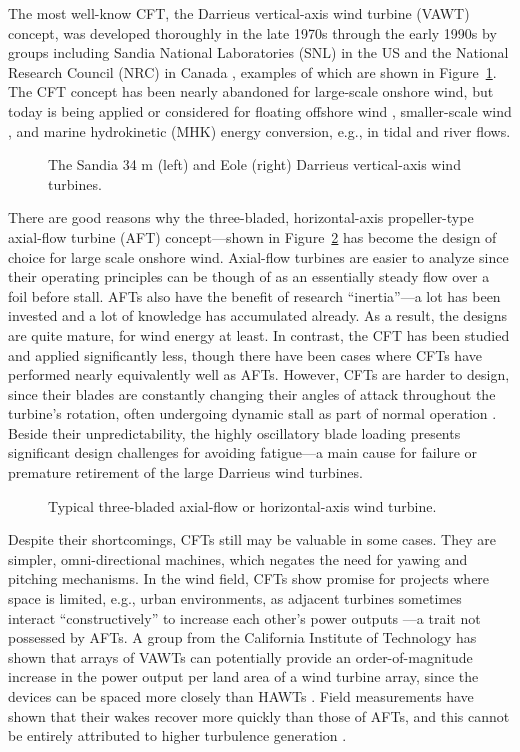 The most well-know CFT, the Darrieus vertical-axis wind turbine (VAWT) concept,
was developed thoroughly in the late 1970s through the early 1990s by groups
including Sandia National Laboratories (SNL) in the US and the National Research
Council (NRC) in Canada \cite{Para2002}, examples of which are shown in
Figure~\ref{fig:Darrieus}. The CFT concept has been nearly abandoned for
large-scale onshore wind, but today is being applied or considered for floating
offshore wind \cite{Sandia2012, Paulsen2011}, smaller-scale wind
\cite{Giges2012}, and marine hydrokinetic (MHK) energy conversion, e.g., in
tidal and river flows. 

\begin{figure}[ht]
\caption{The Sandia 34 m (left) and Eole (right) Darrieus vertical-axis wind
turbines.}
\label{fig:Darrieus}
\end{figure}

There are good reasons why the three-bladed, horizontal-axis propeller-type
axial-flow turbine (AFT) concept---shown in Figure~\ref{fig:AFT} has become the
design of choice for large scale onshore wind. Axial-flow turbines are easier to
analyze since their operating principles can be though of as an essentially
steady flow over a foil before stall. AFTs also have the benefit of research
``inertia''---a lot has been invested and a lot of knowledge has accumulated
already. As a result, the designs are quite mature, for wind energy at least. In
contrast, the CFT has been studied and applied significantly less, though there
have been cases where CFTs have performed nearly equivalently well as AFTs.
However, CFTs are harder to design, since their blades are constantly changing
their angles of attack throughout the turbine's rotation, often undergoing
dynamic stall as part of normal operation \cite{Para2002}. Beside their
unpredictability, the highly oscillatory blade loading presents significant
design challenges for avoiding fatigue---a main cause for failure or premature
retirement of the large Darrieus wind turbines.

\begin{figure}[ht]
\caption{Typical three-bladed axial-flow or horizontal-axis wind turbine.}
\label{fig:AFT}
\end{figure}

Despite their shortcomings, CFTs still may be valuable in some cases. They are
simpler, omni-directional machines, which negates the need for yawing and
pitching mechanisms. In the wind field, CFTs show promise for projects where
space is limited, e.g., urban environments, as adjacent turbines sometimes
interact ``constructively'' to increase each other's power outputs
\cite{Li2010}---a trait not possessed by AFTs. A group from the California
Institute of Technology has shown that arrays of VAWTs can potentially provide
an order-of-magnitude increase in the power output per land area of a wind
turbine array, since the devices can be spaced more closely than HAWTs
\cite{Dabiri2011}. Field measurements have shown that their wakes recover more
quickly than those of AFTs, and this cannot be entirely attributed to higher
turbulence generation \cite{Kinzel2012}.

